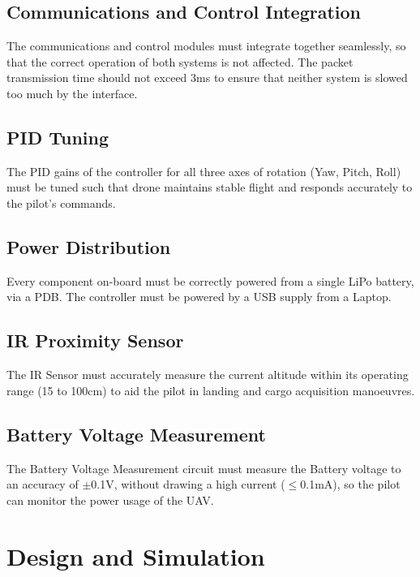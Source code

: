 \documentclass[a4paper,11pt]{article}
\begin{document}
\subsection{Communications and Control Integration}
The communications and control modules must integrate together seamlessly, so that the correct operation of both systems is not affected. The packet transmission time should not exceed 3ms to ensure that neither system is slowed too much by the interface.
\subsection{PID Tuning}
The PID gains of the controller for all three axes of rotation (Yaw, Pitch, Roll) must be tuned such that drone maintains stable flight and responds accurately to the pilot's commands.
\subsection{Power Distribution}
Every component on-board must be correctly powered from a single LiPo battery, via a PDB. The controller must be powered by a USB supply from a Laptop.
\subsection{IR Proximity Sensor}
The IR Sensor must accurately measure the current altitude within its operating range (15 to 100cm) to aid the pilot in landing and cargo acquisition manoeuvres.
\subsection{Battery Voltage Measurement}
The Battery Voltage Measurement circuit must measure the Battery voltage to an accuracy of $\pm$0.1V, without drawing a high current ($\leq$0.1mA), so the pilot can monitor the power usage of the UAV.

\section{Design and Simulation}
\end{document}
